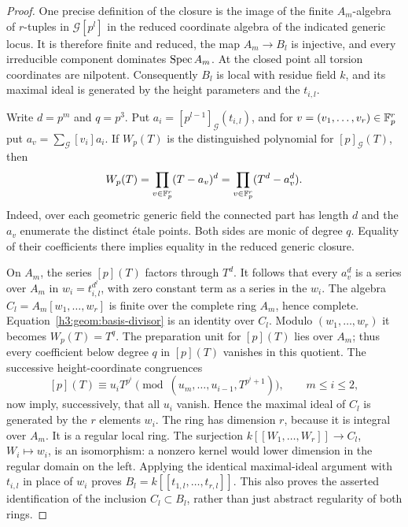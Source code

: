 \begin{proof}
One precise definition of the closure is the image of the finite
$A_m$-algebra of $r$-tuples in $\mathcal G[p^l]$ in the reduced
coordinate algebra of the indicated generic locus.  It is therefore
finite and reduced, the map $A_m\to B_l$ is injective, and every
irreducible component dominates $\operatorname{Spec} A_m$.  At the closed point all
torsion coordinates are nilpotent.  Consequently $B_l$ is local with
residue field $k$, and its maximal ideal is generated by the height
parameters and the $t_{i,l}$.

Write $d=p^m$ and $q=p^3$.  Put
$a_i=[p^{l-1}]_{\mathcal G}(t_{i,l})$, and for
$v=(v_1,\ldots,v_r)\in\mathbb F_p^r$ put
$a_v=\sum_{\mathcal G}[v_i]a_i$.  If $W_p(T)$ is the distinguished
polynomial for $[p]_{\mathcal G}(T)$, then
\begin{equation}\label{h3:geom:basis-divisor}
 W_p(T)=\prod_{v\in\mathbb F_p^r}(T-a_v)^d
       =\prod_{v\in\mathbb F_p^r}(T^d-a_v^d).
\end{equation}
Indeed, over each geometric generic field the connected part has
length $d$ and the $a_v$ enumerate the distinct \'etale points.
Both sides are monic of degree $q$.  Equality of their coefficients
there implies equality in the reduced generic closure.

On $A_m$, the series $[p](T)$ factors through $T^d$.
It follows that every $a_v^d$ is a series over $A_m$ in
$w_i=t_{i,l}^{d^l}$, with zero constant term as a series in the $w_i$.
The algebra $C_l=A_m[w_1,\ldots,w_r]$ is finite over the complete ring
$A_m$, hence complete.  Equation~\eqref{h3:geom:basis-divisor} is an
identity over $C_l$.  Modulo $(w_1,\ldots,w_r)$ it becomes $W_p(T)=T^q$.
The preparation unit for $[p](T)$ lies over $A_m$; thus every
coefficient below degree $q$ in $[p](T)$ vanishes in this quotient.
The successive height-coordinate congruences
\[
 [p](T)\equiv u_iT^{p^i}
 \pmod{(u_m,\ldots,u_{i-1},T^{p^i+1})},\qquad m\leq i\leq2,
\]
now imply, successively, that all $u_i$ vanish.  Hence the maximal
ideal of $C_l$ is generated by the $r$ elements $w_i$.
The ring has dimension $r$, because it is integral over $A_m$.
It is a regular local ring.  The surjection
$k[[W_1,\ldots,W_r]]\to C_l$, $W_i\mapsto w_i$, is an
isomorphism: a nonzero kernel would lower dimension in the regular
domain on the left.  Applying the identical maximal-ideal argument
with $t_{i,l}$ in place of $w_i$ proves $B_l=k[[t_{1,l},\ldots,t_{r,l}]]$.
This also proves the asserted identification of the inclusion
$C_l\subset B_l$, rather than just abstract regularity of both rings.


\end{proof}
